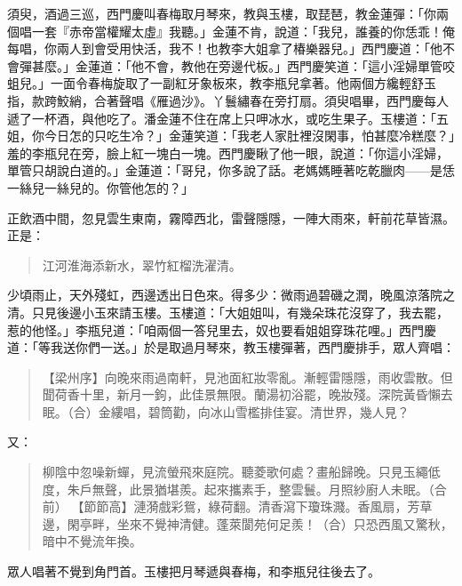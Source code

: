 須臾，酒過三巡，西門慶叫春梅取月琴來，教與玉樓，取琵琶，教金蓮彈：「你兩個唱一套『赤帝當權耀太虛』我聽。」金蓮不肯，說道：「我兒，誰養的你恁乖！俺每唱，你兩人到會受用快活，我不！也教李大姐拿了椿樂器兒。」西門慶道：「他不會彈甚麼。」金蓮道：「他不會，教他在旁邊代板。」西門慶笑道：「這小淫婦單管咬蛆兒。」一面令春梅旋取了一副紅牙象板來，教李瓶兒拿著。他兩個方纔輕舒玉指，款跨鮫綃，合著聲唱《雁過沙》。丫鬟繡春在旁打扇。須臾唱畢，西門慶每人遞了一杯酒，與他吃了。潘金蓮不住在席上只呷冰水，或吃生果子。玉樓道：「五姐，你今日怎的只吃生冷？」金蓮笑道：「我老人家肚裡沒閑事，怕甚麼冷糕麼？」羞的李瓶兒在旁，臉上紅一塊白一塊。西門慶瞅了他一眼，說道：「你這小淫婦，單管只胡說白道的。」金蓮道：「哥兒，你多說了話。老媽媽睡著吃乾臘肉——是恁一絲兒一絲兒的。你管他怎的？」

正飲酒中間，忽見雲生東南，霧障西北，雷聲隱隱，一陣大雨來，軒前花草皆濕。正是：
\begin{quote}
江河淮海添新水，翠竹紅榴洗濯清。
\end{quote}

少頃雨止，天外殘虹，西邊透出日色來。得多少：微雨過碧磯之潤，晚風涼落院之清。只見後邊小玉來請玉樓。玉樓道：「大姐姐叫，有幾朵珠花沒穿了，我去罷，惹的他怪。」李瓶兒道：「咱兩個一答兒里去，奴也要看姐姐穿珠花哩。」西門慶道：「等我送你們一送。」於是取過月琴來，教玉樓彈著，西門慶排手，眾人齊唱：
\begin{quote}
【梁州序】向晚來雨過南軒，見池面紅妝零亂。漸輕雷隱隱，雨收雲散。但聞荷香十里，新月一鉤，此佳景無限。蘭湯初浴罷，晚妝殘。深院黃昏懶去眠。（合）金縷唱，碧筒勸，向冰山雪檻排佳宴。清世界，幾人見？
\end{quote}
又：
\begin{quote}
柳陰中忽噪新蟬，見流螢飛來庭院。聽菱歌何處？畫船歸晚。只見玉繩低度，朱戶無聲，此景猶堪羨。起來攜素手，整雲鬟。月照紗廚人未眠。（合前）
【節節高】漣漪戲彩鴛，綠荷翻。清香瀉下瓊珠濺。香風扇，芳草邊，閑亭畔，坐來不覺神清健。蓬萊閬苑何足羨！（合）只恐西風又驚秋，暗中不覺流年換。
\end{quote}

眾人唱著不覺到角門首。玉樓把月琴遞與春梅，和李瓶兒往後去了。

